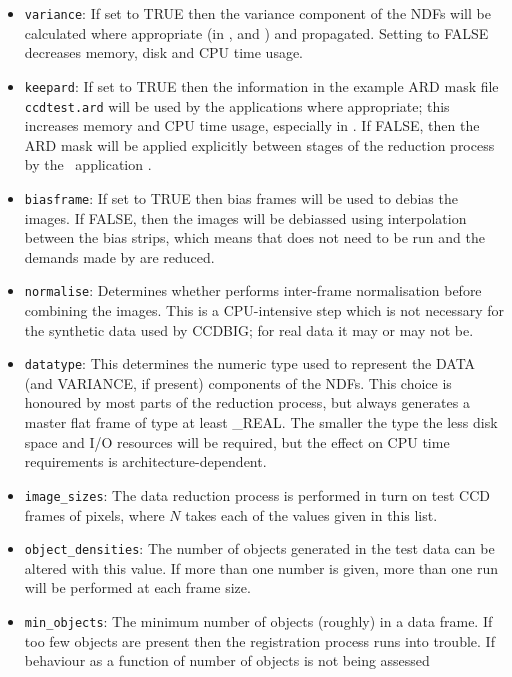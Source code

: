 \begin{itemize}
%
\item {\tt variance}: 
If set to TRUE then the variance component of the NDFs will be  
calculated where appropriate 
(in ,  and ) 
and propagated.
Setting to FALSE decreases memory, disk and CPU time usage.
%
\item {\tt keepard}:
If set to TRUE then the information in the example ARD mask file
{\tt ccdtest.ard} will be used by the 
{\CCDPref} applications where appropriate;
this increases memory and CPU time usage, especially in .
If FALSE, then the ARD mask will be applied explicitly 
between stages of the reduction process 
by the \KAPPAref\ application .
%
\item {\tt biasframe}:
If set to TRUE then bias frames will be used to debias the images. 
If FALSE, then the images will be debiassed using interpolation
between the bias strips, which means that 
does not need to be run and the demands made by 
are reduced.
%
\item {\tt normalise}:
Determines whether  performs 
inter-frame normalisation before combining the images.
This is a CPU-intensive step which
is not necessary for the synthetic data used by CCDBIG;
for real data it may or may not be.
%
\item {\tt datatype}:
This determines the numeric type used to represent the
DATA (and VARIANCE, if present) components of the NDFs.
This choice is honoured by most parts of the reduction 
process, but  always generates a 
master flat frame of type at least \_REAL.
The smaller the type the less disk space and I/O resources
will be required, but the effect on CPU time requirements
is architecture-dependent.
%
\item {\tt image\_sizes}:
The data reduction process is performed in turn on 
test CCD frames of  pixels, where $N$ takes each
of the values given in this list.
%
\item {\tt object\_densities}:
The number of objects generated in the test data can be altered
with this value.  If more than one number is given,  more than one
run will be performed at each frame size.
%
\item {\tt min\_objects}:
The minimum number of objects (roughly) in a data frame.
If too few objects are present then the registration process
runs into trouble.
If behaviour as a function of number of objects is not being assessed 

\end{itemize}
